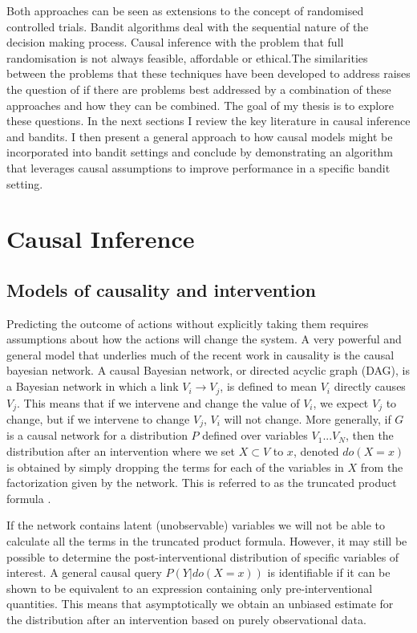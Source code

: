 \documentclass[11pt,a4paper]{article}
\begin{document}
Both approaches can be seen as extensions to the concept of randomised controlled trials. Bandit algorithms deal with the sequential nature of the decision making process. Causal inference with the problem that full randomisation is not always feasible, affordable or ethical.The similarities between the problems that these techniques have been developed to address raises the question of if there are problems best addressed by a combination of these approaches and how they can be combined. The goal of my thesis is to explore these questions. In the next sections I review the key literature in causal inference and bandits. I then present a general approach to  how causal models might be incorporated into bandit settings and conclude by demonstrating an algorithm that leverages causal assumptions to improve performance in a specific bandit setting. 

\section{Causal Inference}

\subsection{Models of causality and intervention}

Predicting the outcome of actions without explicitly taking them requires assumptions about how the actions will change the system. A very powerful and general model that underlies much of the recent work in causality is the causal bayesian network. A causal Bayesian network, or directed acyclic graph (DAG), is a Bayesian network in which a link $V_{i} \rightarrow V_{j}$, is defined to mean $V_{i}$ directly causes $V_{j}$. This means that if we intervene and change the value of $V_{i}$, we expect $V_{j}$ to change, but if we intervene to change $V_{j}$, $V_{i}$ will not change. More generally, if $G$ is a causal network for a distribution $P$ defined over variables $V_{1}...V_{N}$, then the distribution after an intervention where we set $X \subset V$ to $x$, denoted $do(X=x)$ is obtained by simply dropping the terms for each of the variables in $X$ from the factorization given by the network. This is referred to as the truncated product formula \cite{Pearl2000}. 

If the network contains latent (unobservable) variables we will not be able to calculate all the terms in the truncated product formula. However, it may still be possible to determine the post-interventional distribution of specific variables of interest. A general causal query $P(Y|do(X=x))$ is identifiable if it can be shown to be equivalent to an expression containing only pre-interventional quantities. This means that asymptotically we obtain an unbiased estimate for the distribution after an intervention based on purely observational data. 
\end{document}
